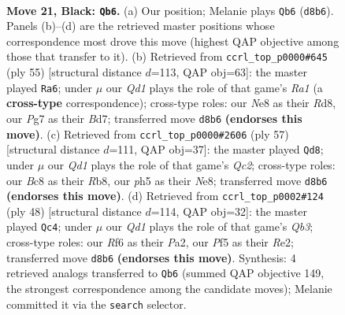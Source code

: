 \documentclass[11pt]{article}
\begin{document}
\clearpage

\begin{figure}[p]\centering
\begin{subfigure}{0.46\textwidth}\centering
\resizebox{\linewidth}{!}{%
\newchessgame
\chessboard[
  setfen={rnbqn1k1/1p4pp/5r2/p4p1P/PbPN3R/6P1/6B1/RNBQ2K1 b - - 3 21},
  showmover=false,
  pgfstyle=straightmove, color=movearrow, markmove={d8-b6}
]}
\caption{}
\end{subfigure}\hfill
\begin{subfigure}{0.46\textwidth}\centering
\resizebox{\linewidth}{!}{%
\newchessgame
\chessboard[
  setfen={r2r2k1/3bqn1p/2pp2p1/1n3p2/NP3P2/4P1PP/1Q1N2B1/R3R1K1 b - - 1 28},
  showmover=false,
  pgfstyle=straightmove, color=movearrow, markmove={a8-a6}
]}
\caption{}
\end{subfigure}
\\[4pt]
\begin{subfigure}{0.46\textwidth}\centering
\resizebox{\linewidth}{!}{%
\newchessgame
\chessboard[
  setfen={1r2n1k1/2qb1pp1/3pp2r/8/1n2PP1p/1PN1QN1P/1K1R2P1/R4B2 b - - 0 29},
  showmover=false,
  pgfstyle=straightmove, color=movearrow, markmove={c7-d8}
]}
\caption{}
\end{subfigure}\hfill
\begin{subfigure}{0.46\textwidth}\centering
\resizebox{\linewidth}{!}{%
\newchessgame
\chessboard[
  setfen={3r2k1/pp1qprb1/7p/2Pn4/3PN1p1/1Q4P1/PB2RPK1/5R2 w - - 0 25},
  showmover=false,
  pgfstyle=straightmove, color=movearrow, markmove={b3-c4}
]}
\caption{}
\end{subfigure}
\caption{\textbf{Move 21, Black: \texttt{Qb6}.} (a) Our position; Melanie plays \texttt{Qb6} (\texttt{d8b6}). Panels (b)--(d) are the retrieved master positions whose correspondence most drove this move (highest QAP objective among those that transfer to it). (b) Retrieved from \texttt{ccrl\_top\_p0000\#645} (ply 55) [structural distance $d$=113, QAP obj=63]: the master played \texttt{Ra6}; under $\mu$ our \emph{Qd1} plays the role of that game's \emph{Ra1} (a \textbf{cross-type} correspondence); cross-type roles: our \emph{N}e8 as their \emph{R}d8, our \emph{P}g7 as their \emph{B}d7; transferred move \texttt{d8b6} \textbf{(endorses this move)}. (c) Retrieved from \texttt{ccrl\_top\_p0000\#2606} (ply 57) [structural distance $d$=111, QAP obj=37]: the master played \texttt{Qd8}; under $\mu$ our \emph{Qd1} plays the role of that game's \emph{Qc2}; cross-type roles: our \emph{B}c8 as their \emph{R}b8, our \emph{p}h5 as their \emph{N}e8; transferred move \texttt{d8b6} \textbf{(endorses this move)}. (d) Retrieved from \texttt{ccrl\_top\_p0002\#124} (ply 48) [structural distance $d$=114, QAP obj=32]: the master played \texttt{Qc4}; under $\mu$ our \emph{Qd1} plays the role of that game's \emph{Qb3}; cross-type roles: our \emph{R}f6 as their \emph{P}a2, our \emph{P}f5 as their \emph{R}e2; transferred move \texttt{d8b6} \textbf{(endorses this move)}. Synthesis: 4 retrieved analogs transferred to \texttt{Qb6} (summed QAP objective 149, the strongest correspondence among the candidate moves); Melanie committed it via the \texttt{search} selector.}
\label{fig:thought-m41}
\end{figure}
\end{document}
